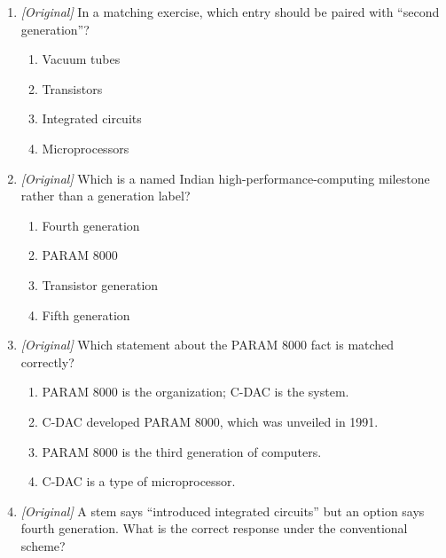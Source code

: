\begin{enumerate}[label=\textbf{Q\arabic*.}, leftmargin=*]
\begin{enumerate}[label=\Roman*.]
    \item An AI application alone establishes a universally fixed
      fifth-generation start date.
  \end{enumerate}
  \begin{enumerate}[label=\Alph*.]
    \item I only
    \item I and II only
    \item II and III only
    \item I, II, and III
  \end{enumerate}
\item \textit{[Original]} In a matching exercise, which entry should be
  paired with ``second generation''?
  \begin{enumerate}[label=\Alph*.]
    \item Vacuum tubes
    \item Transistors
    \item Integrated circuits
    \item Microprocessors
  \end{enumerate}
\item \textit{[Original]} Which is a named Indian high-performance-computing
  milestone rather than a generation label?
  \begin{enumerate}[label=\Alph*.]
    \item Fourth generation
    \item PARAM 8000
    \item Transistor generation
    \item Fifth generation
  \end{enumerate}
\item \textit{[Original]} Which statement about the PARAM 8000 fact is
  matched correctly?
  \begin{enumerate}[label=\Alph*.]
    \item PARAM 8000 is the organization; C-DAC is the system.
    \item C-DAC developed PARAM 8000, which was unveiled in 1991.
    \item PARAM 8000 is the third generation of computers.
    \item C-DAC is a type of microprocessor.
  \end{enumerate}
\item \textit{[Original]} A stem says ``introduced integrated circuits''
  but an option says fourth generation. What is the correct response under
  the conventional scheme?
  \begin{enumerate}[label=\Alph*.]

\end{enumerate}
\end{enumerate}
